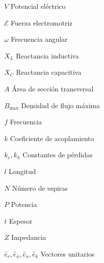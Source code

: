 \documentclass[10pt,conference]{IEEEtran}
\begin{document}
\begin{itemize}[leftmargin=1.5cm]
    \item[$V$] Potencial eléctrico
    \item[$\mathcal{E}$] Fuerza electromotriz
    \item[$\omega$] Frecuencia angular
    \item[$X_L$] Reactancia inductiva
    \item[$X_C$] Reactancia capacitiva
    \item[$A$] Área de sección transversal
    \item[$B_{\text{max}}$] Densidad de flujo máxima
    \item[$f$] Frecuencia
    \item[$k$] Coeficiente de acoplamiento
    \item[$k_e, k_h$] Constantes de pérdidas
    \item[$l$] Longitud
    \item[$N$] Número de espiras
    \item[$P$] Potencia
    \item[$t$] Espesor
    \item[$Z$] Impedancia
    \item[$\hat{e}_r, \hat{e}_\phi, \hat{e}_n, \hat{e}_k$] Vectores unitarios
\end{itemize}
\end{document}

